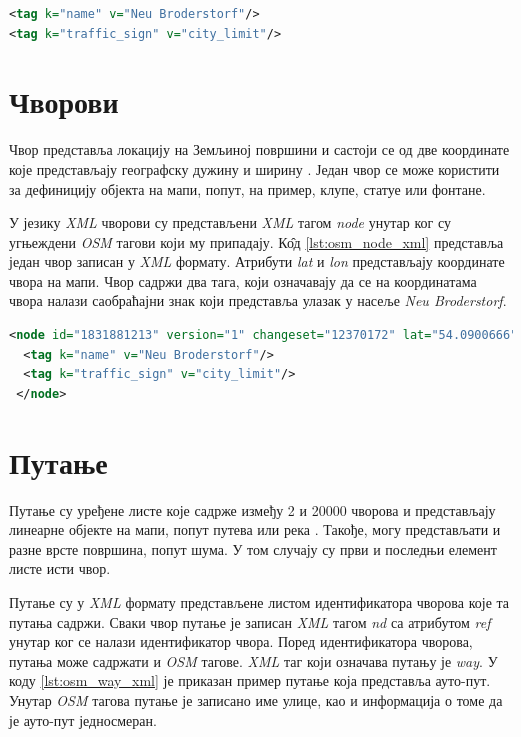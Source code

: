\documentclass[12pt,oneside]{memoir}
\begin{document}
\begin{lstlisting}[language=XML, caption={Пример \textit{OSM} тагова у \textit{XML} формату}, label={lst:osm_tag_xml}]
<tag k="name" v="Neu Broderstorf"/>
<tag k="traffic_sign" v="city_limit"/>
\end{lstlisting}

\section{Чворови}
\label{sec:osm_nodes}

Чвор представља локацију на Земљиној површини и састоји се од две координате које представљају географску дужину и ширину \cite{osm_wiki}. Један чвор се може користити за дефиницију објекта на мапи, попут, на пример, клупе, статуе или фонтане.

У језику \textit{XML} чворови су представљени \textit{XML} тагом \textit{node} унутар ког су угњеждени \textit{OSM} тагови који му припадају. К\^{о}д \ref{lst:osm_node_xml} представља један чвор записан у \textit{XML} формату. Атрибути \textit{lat} и \textit{lon} представљају координате чвора на мапи. Чвор садржи два тага, који означавају да се на координатама чвора налази саобраћајни знак који представља улазак у насеље \textit{Neu Broderstorf}.

\begin{lstlisting}[language=XML, caption={\textit{XML} запис \textit{OSM} чвора који представља саобраћајни знак}, label={lst:osm_node_xml}]
<node id="1831881213" version="1" changeset="12370172" lat="54.0900666" lon="12.2539381" user="lafkor" uid="75625" visible="true" timestamp="2012-07-20T09:43:19Z">
  <tag k="name" v="Neu Broderstorf"/>
  <tag k="traffic_sign" v="city_limit"/>
 </node>
\end{lstlisting}

\section{Путање}
\label{sec:osm_ways}

Путање су уређене листе које садрже између 2 и 20000 чворова и представљају линеарне објекте на мапи, попут путева или река \cite{osm_wiki}. Такође, могу представљати и разне врсте површина, попут шума. У том случају су први и последњи елемент листе исти чвор. 

Путање су у \textit{XML} формату представљене листом идентификатора чворова које та путања садржи. Сваки чвор путање је записан \textit{XML} тагом \textit{nd} са атрибутом \textit{ref} унутар ког се налази идентификатор чвора. Поред идентификатора чворова, путања може садржати и \textit{OSM} тагове. \textit{XML} таг који означава путању је \textit{way}. У коду \ref{lst:osm_way_xml} је приказан пример путање која представља ауто-пут. Унутар \textit{OSM} тагова путање је записано име улице, као и информација о томе да је ауто-пут једносмеран.
\end{document}
